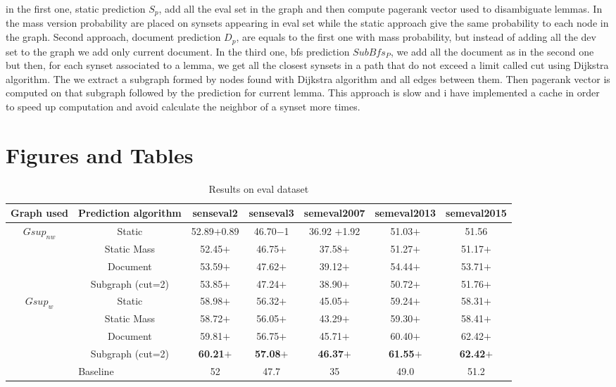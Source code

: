 \documentclass[10pt]{article}
\begin{document}
in the first one, static prediction $S_{p}$, add all the eval set in the graph and then compute pagerank vector used to disambiguate lemmas. In the mass version probability are placed on synsets appearing in eval set while the static approach give the same probability to each node in the graph.
Second approach, document prediction $D_{p}$, are equals to the first one with mass probability, but instead of adding all the dev set to the graph we add only current document.
In the third one, bfs prediction $SubBfs_{P}$, we add all the document as in the second one but then, for each synset associated to a lemma, we get all the closest synsets in a path that do not exceed a limit called cut using Dijkstra algorithm. The we extract a subgraph formed by nodes found with Dijkstra algorithm and all edges between them. Then pagerank vector is computed on that subgraph followed by the prediction for current lemma. This approach is slow and i have implemented a cache in order to speed up computation and avoid calculate the neighbor of a synset more times. 

\newpage
\section{Figures and Tables}
\FloatBarrier
\begin{table}[!ht]
	\centering
	\caption{Results on eval dataset}
	\label{res}
	\begin{tabular}{|c|c||c|c|c|c|c|}
		\hline
		Graph used    & Prediction algorithm  &senseval2 & senseval3& semeval2007&semeval2013& semeval2015		\\ \hline \hline
		\multicolumn{1}{|c|}{\multirow{4}{*}{$Gsup_{nw}$}} 
		 & Static       &   52.89$+$0.89   &        46.70$-$1 &  36.92 $+$1.92 & 51.03$+$ & 51.56    \\ \cline{2-7}  
		& Static Mass   &   52.45$+$   & 46.75$+$& 37.58$+$& 51.27$+$ &51.17$+$ \\ \cline{2-7}  
		& Document         &   53.59$+$   & 47.62$+$& 39.12$+$& 54.44$+$& 53.71$+$     \\ \cline{2-7}  
		& Subgraph (cut=2) & 53.85$+$& 47.24$+$& 38.90$+$ & 50.72$+$ & 51.76$+$ \\ \hline\hline
		\multicolumn{1}{|c|}{\multirow{4}{*}{\textbf{$Gsup_{w}$}}}
		 & Static      & 58.98$+$ & 56.32$+$ & 45.05$+$& 59.24$+$& 58.31$+$ \\ \cline{2-7} 
		& Static Mass  &  58.72$+$      &56.05$+$&43.29$+$&59.30$+$&58.41$+$        \\ \cline{2-7} 
		& Document     &59.81$+$ &56.75$+$&45.71$+$&60.40$+$&62.42$+$       \\ \cline{2-7} 
		& Subgraph (cut=2) &\textbf{60.21}$+$&\textbf{57.08}$+$ &\textbf{46.37}$+$ &\textbf{61.55}$+$& \textbf{62.42}$+$ \\ \hline
		\hline
		\multicolumn{2}{|c|}{\multirow{1}{*}{Baseline}}
		 & 52   &   47.7   & 35  & 49.0 & 51.2    \\ \hline
	\end{tabular}
\end{table}
\end{document}
